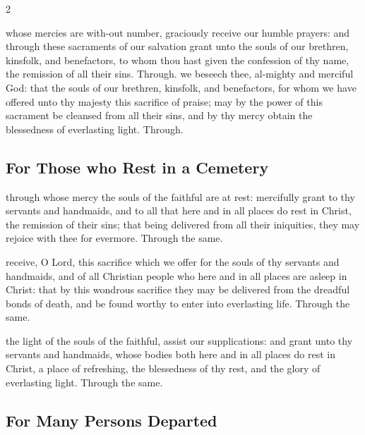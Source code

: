 \begin{multicols}{2}
   \newcolumn

\secret
{} whose mercies are with-out number, graciously receive our humble prayers: and through these sacraments of our salvation grant unto the souls of our brethren, kinsfolk, and benefactors, to whom thou hast given the confession of thy name, the remission of all their sins. Through.
\postcommunion
{} we beseech thee, al-mighty and merciful God: that the souls of our brethren, kinsfolk, and benefactors, for whom we have offered unto thy majesty this sacrifice of praise; may by the power of this sacrament be cleansed from all their sins, and by thy mercy obtain the blessedness of everlasting light.
Through.

\subsection{For Those who Rest in a Cemetery}
\collect
{} through whose mercy the souls of the faithful are at rest: mercifully grant to thy servants and handmaids, and to all that here and in all places do rest in Christ, the remission of their sins; that being delivered from all their iniquities, they may rejoice with thee for evermore. Through the same.

\secret

 receive, O Lord, this sacrifice which we offer for the souls of thy servants and handmaids, and of all Christian people who here and in all places are asleep in Christ: that by this wondrous sacrifice they may be delivered from the dreadful bonds of death, and be found worthy to enter into everlasting life. Through the same.

\vspace{-0.75\baselineskip}

\postcommunion

\vspace{-0.25\baselineskip}

 the light of the souls of the faithful, assist our supplications: and grant unto thy servants and handmaids, whose bodies both here and in all places do rest in Christ, a place of refreshing, the blessedness of thy rest, and the glory of everlasting light. Through the same.

\vspace{-0.5\baselineskip}

\subsection{For Many Persons Departed}


\end{multicols}
